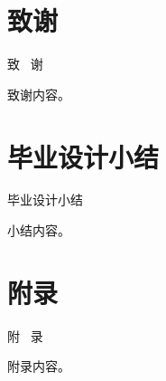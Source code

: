 \documentclass{nwputhesis}
\begin{document}
\makespace %
\section*{致谢}
\begin{center}
    { \blackti \fontsize{16.0600pt}{1.25}致 \, 谢}
\end{center}
致谢内容。

\section*{毕业设计小结}
\makespace
\begin{center}
    { \blackti \fontsize{16.0600pt}{1.25}毕业设计小结}
\end{center}
小结内容。

\makespace
\section*{附录}
\begin{center}
    { \blackti \fontsize{16.0600pt}{1.25}附 \, 录}
\end{center}
附录内容。
\end{document}
